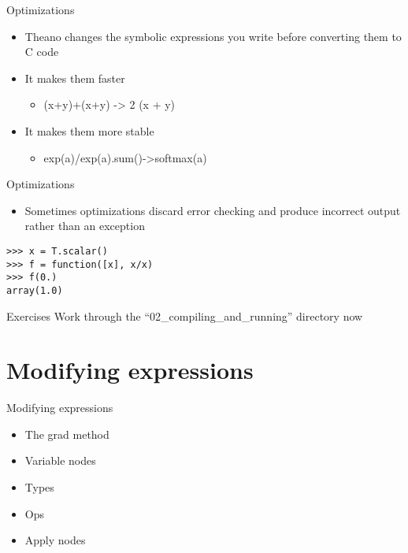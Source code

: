 \documentclass[utf8x]{beamer}
\begin{document}
\begin{frame}{Optimizations}
  \begin{itemize}
  \item Theano changes the symbolic expressions
    you write before converting them to C code
  \item It makes them faster
  \begin{itemize}
  \item (x+y)+(x+y) -> 2 (x + y)
  \end{itemize}
  \item It makes them more stable
  \begin{itemize}
  \item exp(a)/exp(a).sum()->softmax(a)
  \end{itemize}
  \end{itemize}
\end{frame}

\begin{frame}[fragile]{Optimizations}

  \begin{itemize}
  \item Sometimes optimizations discard error
    checking and produce incorrect output
    rather than an exception
  \end{itemize}
\begin{lstlisting}
>>> x = T.scalar()
>>> f = function([x], x/x)
>>> f(0.)
array(1.0)
\end{lstlisting}

\end{frame}

\begin{frame}{Exercises}
Work through the ``02\_compiling\_and\_running'' directory now
\end{frame}

\section{Modifying expressions}
\begin{frame}{Modifying expressions}
  \begin{itemize}
  \item The grad method
  \item Variable nodes
  \item Types
  \item Ops
  \item Apply nodes
  \end{itemize}
\end{frame}
\end{document}
